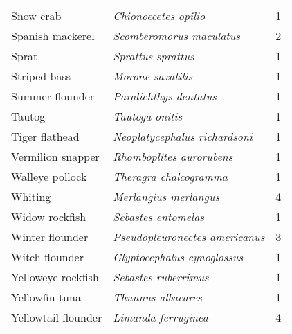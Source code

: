\begin{tabular}{l | l | r}
Snow crab & \textit{Chionoecetes opilio} & 1 \\
Spanish mackerel & \textit{Scomberomorus maculatus} & 2 \\
Sprat & \textit{Sprattus sprattus} & 1 \\
Striped bass & \textit{Morone saxatilis} & 1 \\
Summer flounder & \textit{Paralichthys dentatus} & 1 \\
Tautog & \textit{Tautoga onitis} & 1 \\
Tiger flathead & \textit{Neoplatycephalus richardsoni} & 1 \\
Vermilion snapper & \textit{Rhomboplites aurorubens} & 1 \\
Walleye pollock & \textit{Theragra chalcogramma} & 1 \\
Whiting & \textit{Merlangius merlangus} & 4 \\
Widow rockfish & \textit{Sebastes entomelas} & 1 \\
Winter flounder & \textit{Pseudopleuronectes americanus} & 3 \\
Witch flounder & \textit{Glyptocephalus cynoglossus} & 1 \\
Yelloweye rockfish & \textit{Sebastes ruberrimus} & 1 \\
Yellowfin tuna & \textit{Thunnus albacares} & 1 \\
Yellowtail flounder & \textit{Limanda ferruginea} & 4 \\
\end{tabular}


